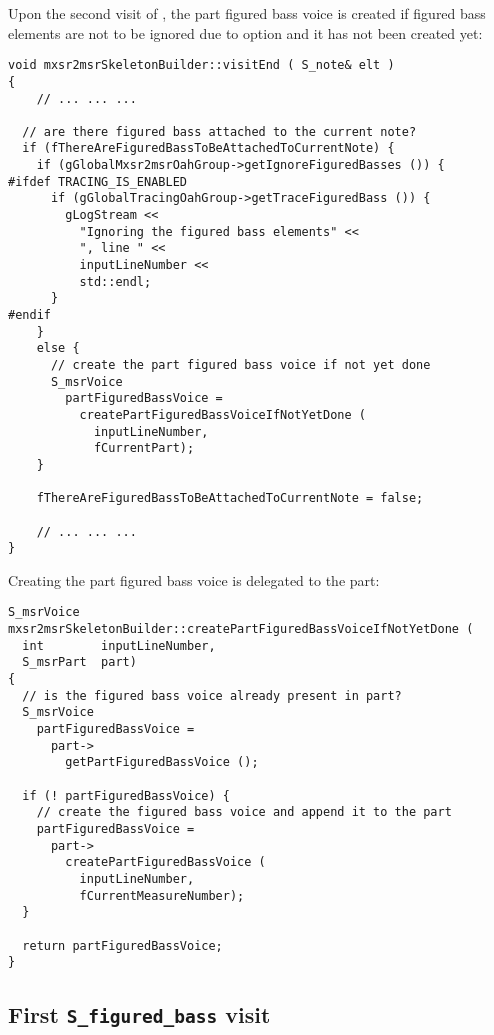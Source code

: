 Upon the second visit of , the part figured bass voice is created if figured bass elements are not to be ignored due to option  and it has not been created yet:
\begin{lstlisting}[language=CPlusPlus]
void mxsr2msrSkeletonBuilder::visitEnd ( S_note& elt )
{
	// ... ... ...

  // are there figured bass attached to the current note?
  if (fThereAreFiguredBassToBeAttachedToCurrentNote) {
    if (gGlobalMxsr2msrOahGroup->getIgnoreFiguredBasses ()) {
#ifdef TRACING_IS_ENABLED
      if (gGlobalTracingOahGroup->getTraceFiguredBass ()) {
        gLogStream <<
          "Ignoring the figured bass elements" <<
          ", line " <<
          inputLineNumber <<
          std::endl;
      }
#endif
    }
    else {
      // create the part figured bass voice if not yet done
      S_msrVoice
        partFiguredBassVoice =
          createPartFiguredBassVoiceIfNotYetDone (
            inputLineNumber,
            fCurrentPart);
    }

    fThereAreFiguredBassToBeAttachedToCurrentNote = false;

	// ... ... ...
}
\end{lstlisting}

Creating the part figured bass voice is delegated to the part:
\begin{lstlisting}[language=CPlusPlus]
S_msrVoice mxsr2msrSkeletonBuilder::createPartFiguredBassVoiceIfNotYetDone (
  int        inputLineNumber,
  S_msrPart  part)
{
  // is the figured bass voice already present in part?
  S_msrVoice
    partFiguredBassVoice =
      part->
        getPartFiguredBassVoice ();

  if (! partFiguredBassVoice) {
    // create the figured bass voice and append it to the part
    partFiguredBassVoice =
      part->
        createPartFiguredBassVoice (
          inputLineNumber,
          fCurrentMeasureNumber);
  }

  return partFiguredBassVoice;
}
\end{lstlisting}


\subsection{First {\tt S_figured_bass} visit}


